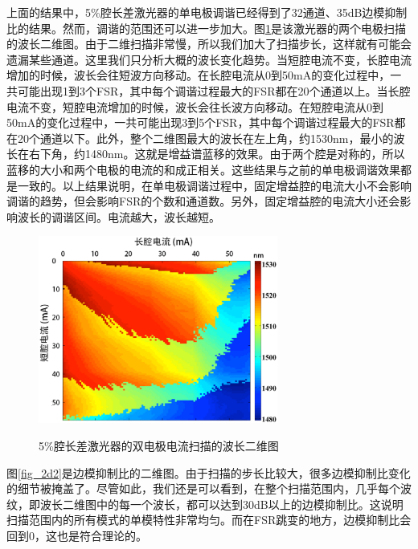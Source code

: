 \documentclass{ZJUthesis}
\begin{document}
上面的结果中，5\%腔长差激光器的单电极调谐已经得到了32通道、35dB边模抑制比的结果。然而，调谐的范围还可以进一步加大。图\ref{fig_2d}是该激光器的两个电极扫描的波长二维图。由于二维扫描非常慢，所以我们加大了扫描步长，这样就有可能会遗漏某些通道。这里我们只分析大概的波长变化趋势。当短腔电流不变，长腔电流增加的时候，波长会往短波方向移动。在长腔电流从0到50mA的变化过程中，一共可能出现1到3个FSR，其中每个调谐过程最大的FSR都在20个通道以上。当长腔电流不变，短腔电流增加的时候，波长会往长波方向移动。在短腔电流从0到50mA的变化过程中，一共可能出现3到5个FSR，其中每个调谐过程最大的FSR都在20个通道以下。此外，整个二维图最大的波长在左上角，约1530nm，最小的波长在右下角，约1480nm。这就是增益谱蓝移的效果。由于两个腔是对称的，所以蓝移的大小和两个电极的电流的和成正相关。这些结果与之前的单电极调谐效果都是一致的。以上结果说明，在单电极调谐过程中，固定增益腔的电流大小不会影响调谐的趋势，但会影响FSR的个数和通道数。另外，固定增益腔的电流大小还会影响波长的调谐区间。电流越大，波长越短。

\begin{figure}[!ht]
  \centering
  \includegraphics[width=0.7\textwidth]{./Pictures/2d.eps}\\
  \caption{5\%腔长差激光器的双电极电流扫描的波长二维图}
  \label{fig_2d}
\end{figure}

图\ref{fig_2d2}是边模抑制比的二维图。由于扫描的步长比较大，很多边模抑制比变化的细节被掩盖了。尽管如此，我们还是可以看到，在整个扫描范围内，几乎每个波纹，即波长二维图中的每一个波长，都可以达到30dB以上的边模抑制比。这说明扫描范围内的所有模式的单模特性非常均匀。而在FSR跳变的地方，边模抑制比会回到0，这也是符合理论的。
\end{document}

